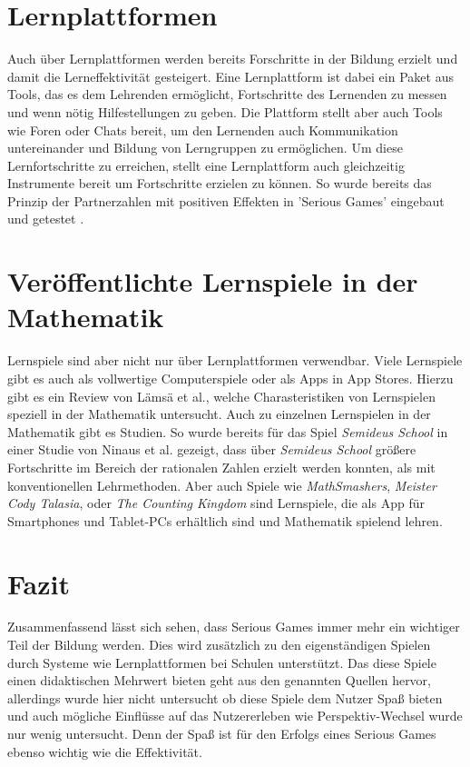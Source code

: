 \section{Lernplattformen}
Auch über Lernplattformen werden bereits Forschritte in der Bildung erzielt und damit die Lerneffektivität gesteigert. Eine Lernplattform ist dabei ein Paket aus Tools, das es dem Lehrenden ermöglicht, Fortschritte des Lernenden zu messen und wenn nötig Hilfestellungen zu geben. Die Plattform stellt aber auch Tools wie Foren oder Chats bereit, um den Lernenden auch Kommunikation untereinander und Bildung von Lerngruppen zu ermöglichen. Um diese Lernfortschritte zu erreichen, stellt eine Lernplattform auch gleichzeitig Instrumente bereit um Fortschritte erzielen zu können. So wurde bereits das Prinzip der Partnerzahlen mit positiven Effekten in 'Serious Games' eingebaut und getestet \cite{JUNG2015}.
\section{Veröffentlichte Lernspiele in der Mathematik}
Lernspiele sind aber nicht nur über Lernplattformen verwendbar. Viele Lernspiele gibt es auch als vollwertige Computerspiele oder als Apps in App Stores. Hierzu gibt es ein Review von Lämsä et al.\cite{Lamsa2018}, welche Charasteristiken von Lernspielen speziell in der Mathematik untersucht. Auch zu einzelnen Lernspielen in der Mathematik gibt es Studien. So wurde bereits für das Spiel \textit{Semideus School} \cite{semideus} in einer Studie von Ninaus et al.\cite{Ninaus2016} gezeigt, dass über \textit{Semideus School} größere Fortschritte im Bereich der rationalen Zahlen erzielt werden konnten, als mit konventionellen Lehrmethoden. Aber auch Spiele wie \textit{MathSmashers}\cite{ludoscience}, \textit{Meister Cody Talasia}\cite{meisterCody}, oder \textit{The Counting Kingdom}\cite{kingdom} sind Lernspiele, die als App für Smartphones und Tablet-PCs erhältlich sind und Mathematik spielend lehren.
\section{Fazit}
Zusammenfassend lässt sich sehen, dass Serious Games immer mehr ein wichtiger Teil der Bildung werden\cite{Hainey2016}\cite{Boyle2016}. Dies wird zusätzlich zu den eigenständigen Spielen durch Systeme wie Lernplattformen bei Schulen unterstützt. Das diese Spiele einen didaktischen Mehrwert bieten geht aus den genannten Quellen hervor, allerdings wurde hier nicht untersucht ob diese Spiele dem Nutzer Spaß bieten und auch mögliche Einflüsse auf das Nutzererleben wie Perspektiv-Wechsel wurde nur wenig untersucht. Denn der Spaß ist für den Erfolgs eines Serious Games ebenso wichtig wie die Effektivität.